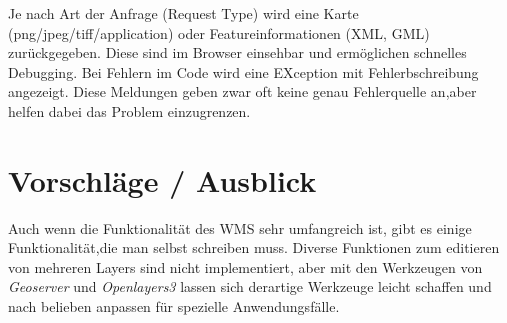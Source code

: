 Je nach Art der Anfrage (Request Type) wird eine Karte (png/jpeg/tiff/application) oder Featureinformationen (XML, GML) zurückgegeben. Diese sind im Browser einsehbar und ermöglichen schnelles Debugging. Bei Fehlern im Code wird eine EXception mit Fehlerbschreibung angezeigt. Diese Meldungen geben zwar oft keine genau Fehlerquelle an,aber helfen dabei das Problem einzugrenzen.
\section{Vorschl\"age / Ausblick}
Auch wenn die Funktionalität des WMS sehr umfangreich ist, gibt es einige Funktionalität,die man selbst schreiben muss. Diverse Funktionen zum editieren von mehreren Layers sind nicht implementiert, aber mit den Werkzeugen von \emph{Geoserver} und \emph{Openlayers3} lassen sich derartige Werkzeuge leicht schaffen und nach belieben anpassen für spezielle Anwendungsfälle.

